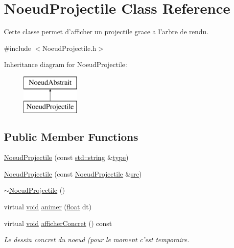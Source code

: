 \hypertarget{class_noeud_projectile}{\section{Noeud\-Projectile Class Reference}
\label{class_noeud_projectile}
}


Cette classe permet d'afficher un projectile grace a l'arbre de rendu.  




{\ttfamily \#include $<$Noeud\-Projectile.\-h$>$}

Inheritance diagram for Noeud\-Projectile\-:\begin{figure}[H]
\begin{center}
\leavevmode
\includegraphics[height=2.000000cm]{class_noeud_projectile}
\end{center}
\end{figure}
\subsection*{Public Member Functions}
\begin{DoxyCompactItemize}
\item 
\hyperlink{class_noeud_projectile_acc40e58645d941f6a8169e009f3bffda}{Noeud\-Projectile} (const \hyperlink{glew_8h_ae84541b4f3d8e1ea24ec0f466a8c568b}{std\-::string} \&\hyperlink{fmod_8h_a5338b9cb3874378d7e5adfbe80a8a381}{type})
\item 
\hyperlink{class_noeud_projectile_a41b1f5a62f11d001af734c6afa7131ba}{Noeud\-Projectile} (const \hyperlink{class_noeud_projectile}{Noeud\-Projectile} \&\hyperlink{glew_8h_a72e0fdf0f845ded60b1fada9e9195cd7}{src})
\item 
\hyperlink{class_noeud_projectile_a48ec93ba735e4d4e05c365bcaf901d15}{$\sim$\-Noeud\-Projectile} ()
\item 
virtual \hyperlink{wglew_8h_aeea6e3dfae3acf232096f57d2d57f084}{void} \hyperlink{class_noeud_projectile_afaca531eaf522998d34eba290a8ffb74}{animer} (\hyperlink{fmod_8h_aeb841aa4b4b5f444b5d739d865b420af}{float} dt)
\item 
virtual \hyperlink{wglew_8h_aeea6e3dfae3acf232096f57d2d57f084}{void} \hyperlink{class_noeud_projectile_a531942f329113293d45b036aee60fafc}{afficher\-Concret} () const 
\begin{DoxyCompactList}\small\item\em Le dessin concret du noeud (pour le moment c'est temporaire. \end{DoxyCompactList}\end{DoxyCompactItemize}
